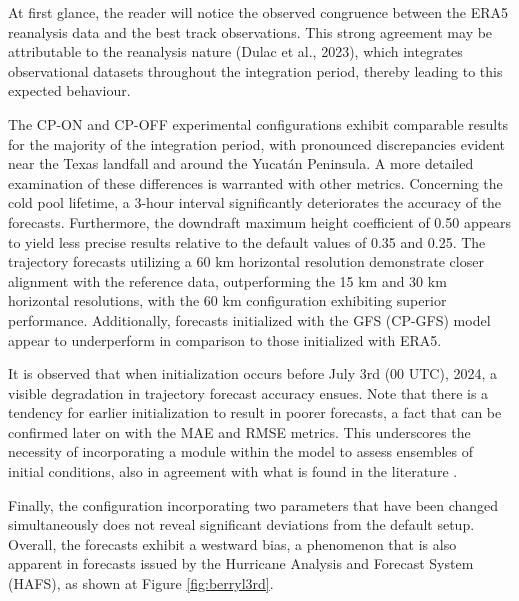 At first glance, the reader will notice the observed congruence between the ERA5 reanalysis data and the best track observations. This strong agreement may be attributable to the reanalysis nature (Dulac et al., 2023), which integrates observational datasets throughout the integration period, thereby leading to this expected behaviour.

The CP-ON and CP-OFF experimental configurations exhibit comparable results for the majority of the integration period, with pronounced discrepancies evident near the Texas landfall and around the Yucatán Peninsula. A more detailed examination of these differences is warranted with other metrics. Concerning the cold pool lifetime, a 3-hour interval significantly deteriorates the accuracy of the forecasts. Furthermore, the downdraft maximum height coefficient of 0.50 appears to yield less precise results relative to the default values of 0.35 and 0.25. The trajectory forecasts utilizing a 60 km horizontal resolution demonstrate closer alignment with the reference data, outperforming the 15 km and 30 km horizontal resolutions, with the 60 km configuration exhibiting superior performance. Additionally, forecasts initialized with the GFS (CP-GFS) model appear to underperform in comparison to those initialized with ERA5.

It is observed that when initialization occurs before July 3rd (00 UTC), 2024, a visible degradation in trajectory forecast accuracy ensues. Note that there is a tendency for earlier initialization to result in poorer forecasts, a fact that can be confirmed later on with the MAE and RMSE metrics. This underscores the necessity of incorporating a module within the model to assess ensembles of initial conditions, also in agreement with what is found in the literature \cite{donkin2023capability}.

Finally, the configuration incorporating two parameters that have been changed simultaneously does not reveal significant deviations from the default setup. Overall, the forecasts exhibit a westward bias, a phenomenon that is also apparent in forecasts issued by the Hurricane Analysis and Forecast System (HAFS), as shown at Figure \ref{fig:berryl3rd}.

